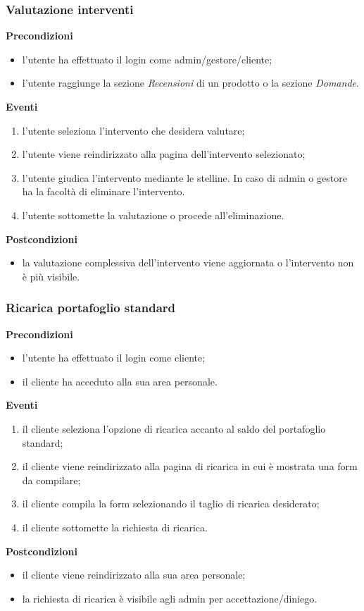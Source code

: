 \documentclass[a4paper, 14pt]{article}
\begin{document}
\begin{flushleft}
			\bigskip
			\subsubsection{Valutazione interventi}
			\textbf{Precondizioni}
			\begin{itemize}
				\item l'utente ha effettuato il login come admin/gestore/cliente;
				\item l'utente raggiunge la sezione \textit{Recensioni} di un prodotto o la sezione \textit{Domande}.
			\end{itemize}
			\textbf{Eventi}
			\begin{enumerate}
				\item l'utente seleziona l'intervento che desidera valutare;
				\item l'utente viene reindirizzato alla pagina dell'intervento selezionato;
				\item l'utente giudica l'intervento mediante le stelline. In caso di admin o gestore ha la facoltà di eliminare l'intervento.
				\item l'utente sottomette la valutazione o procede all'eliminazione.
			\end{enumerate}
			\textbf{Postcondizioni}
			\begin{itemize}
				\item la valutazione complessiva dell'intervento viene aggiornata o l'intervento non è più visibile.
			\end{itemize}
		
			\bigskip
			\subsubsection{Ricarica portafoglio standard}
			\textbf{Precondizioni}
			\begin{itemize}
				\item l'utente ha effettuato il login come cliente;
				\item il cliente ha acceduto alla sua area personale.
			\end{itemize}
			\textbf{Eventi}
			\begin{enumerate}
				\item il cliente seleziona l'opzione di ricarica accanto al saldo del portafoglio standard;
				\item il cliente viene reindirizzato alla pagina di ricarica in cui è mostrata una form da compilare;
				\item il cliente compila la form selezionando il taglio di ricarica desiderato;
				\item il cliente sottomette la richiesta di ricarica.
			\end{enumerate}
			\textbf{Postcondizioni}
			\begin{itemize}
				\item il cliente viene reindirizzato alla sua area personale;
				\item la richiesta di ricarica è visibile agli admin per accettazione/diniego.
			\end{itemize}
		

\end{flushleft}
\end{document}
